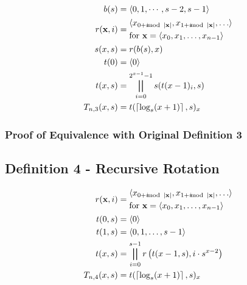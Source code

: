 \documentclass[conference]{IEEEtran}
\begin{document}
\begin{equation}
    \label{eq:pnd03}
    \begin{aligned}
            b(s) &= \tuple{0, 1, \cdots, s - 2, s - 1} \\
r(\mathbf{x}, i) &= \begin{aligned}[c]
                   &\tuple{x_{0 + i \mod{|\mathbf{x}|}}, x_{1 + i \mod{|\mathbf{x}|}}, \ldots} \\
                   &\text{for } \mathbf{x} = \tuple{x_0, x_1, \ldots, x_{n-1}}
        \end{aligned} \\
         s(x, s) &= r(b(s), x) \\
            t(0) &= \tuple{0} \\
         t(x, s) &= \bigparallel_{i=0}^{2^{x-1}-1} s(t(x-1)_i, s)  \\
   T_{n,3}(x, s) &= t(\ceil{\log_s(x + 1)}, s)_x
    \end{aligned}
\end{equation}

\subsubsection{Proof of Equivalence with Original Definition 3}

\subsection{Definition 4 - Recursive Rotation}

\begin{equation}
    \label{eq:pnd04}
    \begin{aligned}
r(\mathbf{x}, i) &= \begin{aligned}[c]
                   &\tuple{x_{0 + i \mod{|\mathbf{x}|}}, x_{1 + i \mod{|\mathbf{x}|}}, \ldots} \\
                   &\text{for } \mathbf{x} = \tuple{x_0, x_1, \ldots, x_{n-1}}
        \end{aligned} \\
         t(0, s) &= \tuple{0} \\
         t(1, s) &= \tuple{0, 1, \ldots, s - 1} \\
         t(x, s) &= \bigparallel_{i=0}^{s-1} r\left(t(x-1, s), i \cdot s^{x-2}\right) \\
   T_{n,4}(x, s) &= t(\ceil{\log_s(x + 1)}, s)_x
    \end{aligned}
\end{equation}
\end{document}
